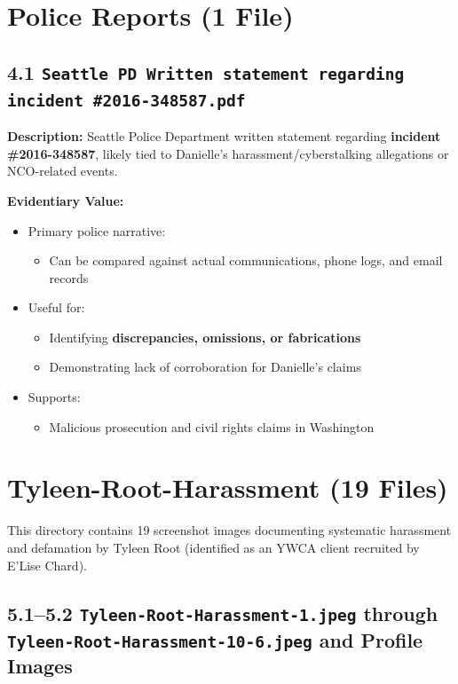 \documentclass[11pt, letterpaper]{article}
\begin{document}
\newpage

\section{Police Reports (1 File)}

\subsection{4.1 \texttt{Seattle PD Written statement regarding incident \#2016-348587.pdf}}

\textbf{Description:} Seattle Police Department written statement regarding \textbf{incident \#2016-348587}, likely tied to Danielle's harassment/cyberstalking allegations or NCO-related events.

\textbf{Evidentiary Value:}

\begin{itemize}[leftmargin=*]
  \item Primary police narrative:
    \begin{itemize}
      \item Can be compared against actual communications, phone logs, and email records
    \end{itemize}
  \item Useful for:
    \begin{itemize}
      \item Identifying \textbf{discrepancies, omissions, or fabrications}
      \item Demonstrating lack of corroboration for Danielle's claims
    \end{itemize}
  \item Supports:
    \begin{itemize}
      \item Malicious prosecution and civil rights claims in Washington
    \end{itemize}
\end{itemize}

\newpage

\section{Tyleen-Root-Harassment (19 Files)}

This directory contains 19 screenshot images documenting systematic harassment and defamation by Tyleen Root (identified as an YWCA client recruited by E'Lise Chard).

\subsection{5.1--5.2 \texttt{Tyleen-Root-Harassment-1.jpeg} through \texttt{Tyleen-Root-Harassment-10-6.jpeg} and Profile Images}
\end{document}
